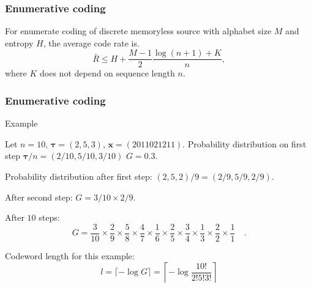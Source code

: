 \documentclass[14pt]{beamer}
\renewcommand{\vec}[1]{\ensuremath{\boldsymbol{#1}}}
\begin{document}
\begin{frame}
\frametitle{Enumerative coding}   

    \begin{theorem}
    \label{num_coding} For enumerate coding of discrete memoryless source with alphabet size $M$ and entropy $H$, the average code rate is.
    \begin{equation}
    \label{eq3_31} \bar {R} \le H + \frac{M - 1}{2}\frac{\log (n + 1) +
    K}{n},
    \end{equation}
    where $K$ does not depend on sequence length $n$.
    \end{theorem}
    
\end{frame}



\begin{frame}
\frametitle{Enumerative coding}
Example

\begin{itemize}
\small{
    \item 
    Let $n=10$, $\vec \tau =(2, 5, 3)$, $\vec x  = (2 0 1 1 0 2 1 2 1 1)$.
    Probability distribution on first step $\vec \tau / n=(2/10, 5/10, 3/10)$ $G=0.3$.
    
    \item 
    Probability distribution after first step:
    $(2, 5, 2)/9=(2/9, 5/9, 2/9)$. 
    
    \item 
    After second step: $G=3/10\times 2/9$. 
    
    \item 
    After $10$ steps:
    \[
    G=\frac {3}{10}\times \frac {2}{9}\times\frac {5}{8}\times
    \frac {4}{7}\times\frac {1}{6}\times
    \frac {2}{5}\times\frac {3}{4}\times\frac {1}{3}\times
    \frac {2}{2}\times\frac {1}{1}\quad.
    \]
    
    \item
    Codeword length for this example:
    \[
    l=\lceil -\log G\rceil =\left\lceil -\log \frac{10!}{2!5!3!}\right\rceil
    \]
}
\end{itemize}
\end{frame}
\end{document}
